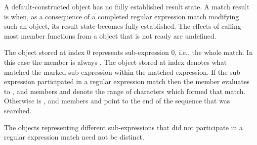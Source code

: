 \pnum
A default-constructed  object has no fully established result state. A
match result is  when, as a consequence of a completed regular expression match
modifying such an object, its result state becomes fully established. The effects of calling
most member functions from a  object that is not ready are undefined.

\pnum
{}%
The  object stored at index 0 represents sub-expression 0,
i.e., the whole match. In this case the  member
 is always . The 
object stored at index  denotes what matched the marked
sub-expression  within the matched expression. If the
sub-expression  participated in a regular expression
match then the  member  evaluates to , and
members  and  denote the range of characters
 which formed that
match. Otherwise  is , and members 
and  point to the end of the sequence
that was searched.
\begin{note}
The  objects representing
different sub-expressions that did not participate in a regular expression
match need not be distinct.
\end{note}

